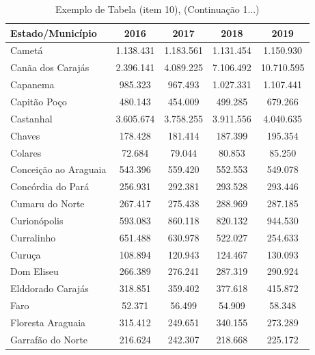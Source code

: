\newpage
\begin{table}[H]
    \centering
    {
    \caption{Exemplo de Tabela (item 10), (Continuação 1...)}  
    \label{item 10 regras2}
    \vspace{0.1cm}
\begin{tabular}{l|c|c|c|c}
  \hline\hline
  Estado/Município        &    2016    &    2017   &    2018   &  2019       \\
  \hline\hline
   Cametá                 &  1.138.431 & 1.183.561 & 1.131.454 & 1.150.930    \\
   Canãa dos Carajás      &  2.396.141 & 4.089.225 & 7.106.492 & 10.710.595   \\
   Capanema               &  985.323   & 967.493   & 1.027.331 & 1.107.441    \\
   Capitão Poço           &  480.143   & 454.009   & 499.285   & 679.266      \\ 
   Castanhal              &  3.605.674 & 3.758.255 & 3.911.556 & 4.040.635    \\
   Chaves                 &  178.428   & 181.414   & 187.399   & 195.354      \\
   Colares                &  72.684    & 79.044    & 80.853    &  85.250     \\
   Conceição ao Araguaia  &  543.396   & 559.420   & 552.553   &  549.078    \\
   Concórdia do Pará      &  256.931   & 292.381   & 293.528   &  293.446    \\
   Cumaru do Norte        &  267.417   & 275.438   & 288.969   &  287.185    \\
   Curionópolis           & 593.083    & 860.118   & 820.132   &  944.530    \\
   Curralinho             & 651.488    &  630.978  &  522.027  &  254.633    \\
   Curuça                 & 108.894    &  120.943  &  124.467  & 130.093     \\
   Dom Eliseu             & 266.389    &  276.241  & 287.319   & 290.924     \\
   Elddorado Carajás      & 318.851    &  359.402  &  377.618  & 415.872     \\
   Faro                   & 52.371     &  56.499   & 54.909    & 58.348      \\
   Floresta  Araguaia     & 315.412    &  249.651  & 340.155   &  273.289   \\
   Garrafão do Norte      & 216.624    &  242.307  &  218.668  &  225.172  \\

\end{tabular}}
\end{table}
